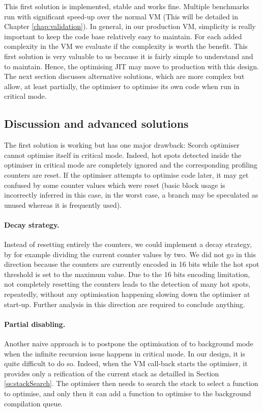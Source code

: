 \documentclass[a4paper,12pt,twoside]{../includes/ThesisStyle}
\begin{document}
This first solution is implemented, stable and works fine. Multiple benchmarks run with significant speed-up over the normal VM (This will be detailed in Chapter \ref{chap:validation}). In general, in our production VM, simplicity is really important to keep the code base relatively easy to maintain. For each added complexity in the VM we evaluate if the complexity is worth the benefit. This first solution is very valuable to us because it is fairly simple to understand and to maintain. Hence, the optimising JIT may move to production with this design. The next section discusses alternative solutions, which are more complex but allow, at least partially, the optimiser to optimise its own code when run in critical mode.

\subsection{Discussion and advanced solutions}

The first solution is working but has one major drawback: Scorch optimiser cannot optimise itself in critical mode. Indeed, hot spots detected inside the optimiser in critical mode are completely ignored and the corresponding profiling counters are reset. If the optimiser attempts to optimise code later, it may get confused by some counter values which were reset (basic block usage is incorrectly inferred in this case, in the worst case, a branch may be speculated as unused whereas it is frequently used). 

\paragraph{Decay strategy.} Instead of resetting entirely the counters, we could implement a decay strategy, by for example dividing the current counter values by two. We did not go in this direction because the counters are currently encoded in 16 bits while the hot spot threshold is set to the maximum value. Due to the 16 bits encoding limitation, not completely resetting the counters leads to the detection of many hot spots, repeatedly, without any optimisation happening slowing down the optimiser at start-up. Further analysis in this direction are required to conclude anything.

\paragraph{Partial disabling.} \label{par:PartialDisabing} Another naive approach is to postpone the optimisation of to background mode when the infinite recursion issue happens in critical mode. In our design, it is quite difficult to do so. Indeed, when the VM call-back starts the optimiser, it provides only a reification of the current stack as detailled in Section \ref{ss:stackSearch}. The optimiser then needs to search the stack to select a function to optimise, and only then it can add a function to optimise to the background compilation queue. 
\end{document}
